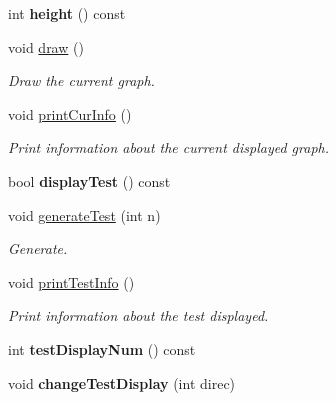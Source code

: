 \begin{DoxyCompactItemize}
\item 
int {\bfseries height} () const \hypertarget{classcmst_1_1_window_a6fc02b2afee52c0f71b6a3bd39c9210f}{}\label{classcmst_1_1_window_a6fc02b2afee52c0f71b6a3bd39c9210f}

\item 
void \hyperlink{classcmst_1_1_window_a1d78ef796691e87ed3b4978f373c9890}{draw} ()\hypertarget{classcmst_1_1_window_a1d78ef796691e87ed3b4978f373c9890}{}\label{classcmst_1_1_window_a1d78ef796691e87ed3b4978f373c9890}

\begin{DoxyCompactList}\small\item\em Draw the current graph. \end{DoxyCompactList}\item 
void \hyperlink{classcmst_1_1_window_a73eb23d7d7418cb288022e623e590461}{print\+Cur\+Info} ()\hypertarget{classcmst_1_1_window_a73eb23d7d7418cb288022e623e590461}{}\label{classcmst_1_1_window_a73eb23d7d7418cb288022e623e590461}

\begin{DoxyCompactList}\small\item\em Print information about the current displayed graph. \end{DoxyCompactList}\item 
bool {\bfseries display\+Test} () const \hypertarget{classcmst_1_1_window_aa3f5edeebdd298190bdb4676b4838f75}{}\label{classcmst_1_1_window_aa3f5edeebdd298190bdb4676b4838f75}

\item 
void \hyperlink{classcmst_1_1_window_acda99115d9c67f83de4d8f5a94f2647c}{generate\+Test} (int n)
\begin{DoxyCompactList}\small\item\em Generate. \end{DoxyCompactList}\item 
void \hyperlink{classcmst_1_1_window_a471e1648f99754f7c2cbfbbb1e8ab556}{print\+Test\+Info} ()\hypertarget{classcmst_1_1_window_a471e1648f99754f7c2cbfbbb1e8ab556}{}\label{classcmst_1_1_window_a471e1648f99754f7c2cbfbbb1e8ab556}

\begin{DoxyCompactList}\small\item\em Print information about the test displayed. \end{DoxyCompactList}\item 
int {\bfseries test\+Display\+Num} () const \hypertarget{classcmst_1_1_window_ae456c1bf45fc28133390fcc881fbd612}{}\label{classcmst_1_1_window_ae456c1bf45fc28133390fcc881fbd612}

\item 
void {\bfseries change\+Test\+Display} (int direc)\hypertarget{classcmst_1_1_window_aa8dc3725888e12fc2c6e3626ab7b600a}{}\label{classcmst_1_1_window_aa8dc3725888e12fc2c6e3626ab7b600a}

\end{DoxyCompactItemize}
